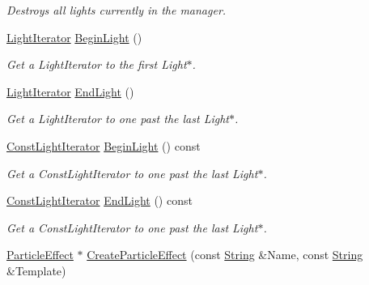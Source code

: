 \begin{DoxyCompactItemize}
\begin{DoxyCompactList}\small\item\em Destroys all lights currently in the manager. \item\end{DoxyCompactList}\item 
\hyperlink{classphys_1_1SceneManager_a2764b9082b4aecbf833c2f6e9f174ba0}{LightIterator} \hyperlink{classphys_1_1SceneManager_a710bed731b5674cae3bb09853f3a0cd1}{BeginLight} ()
\begin{DoxyCompactList}\small\item\em Get a LightIterator to the first Light$\ast$. \item\end{DoxyCompactList}\item 
\hyperlink{classphys_1_1SceneManager_a2764b9082b4aecbf833c2f6e9f174ba0}{LightIterator} \hyperlink{classphys_1_1SceneManager_a4b44838cddfa710a538c02f3b261c3c7}{EndLight} ()
\begin{DoxyCompactList}\small\item\em Get a LightIterator to one past the last Light$\ast$. \item\end{DoxyCompactList}\item 
\hyperlink{classphys_1_1SceneManager_a417c57b560317661d0c7d836a88f52ac}{ConstLightIterator} \hyperlink{classphys_1_1SceneManager_a468298df736ca62876592bf5e8ce36ac}{BeginLight} () const 
\begin{DoxyCompactList}\small\item\em Get a ConstLightIterator to one past the last Light$\ast$. \item\end{DoxyCompactList}\item 
\hyperlink{classphys_1_1SceneManager_a417c57b560317661d0c7d836a88f52ac}{ConstLightIterator} \hyperlink{classphys_1_1SceneManager_a606664d81c965a853dc1adf22c4559dc}{EndLight} () const 
\begin{DoxyCompactList}\small\item\em Get a ConstLightIterator to one past the last Light$\ast$. \item\end{DoxyCompactList}\item 
\hyperlink{classphys_1_1ParticleEffect}{ParticleEffect} $\ast$ \hyperlink{classphys_1_1SceneManager_a67a33ba38c8e8b198c52ca7bcf847751}{CreateParticleEffect} (const \hyperlink{namespacephys_aa03900411993de7fbfec4789bc1d392e}{String} \&Name, const \hyperlink{namespacephys_aa03900411993de7fbfec4789bc1d392e}{String} \&Template)

\end{DoxyCompactItemize}
